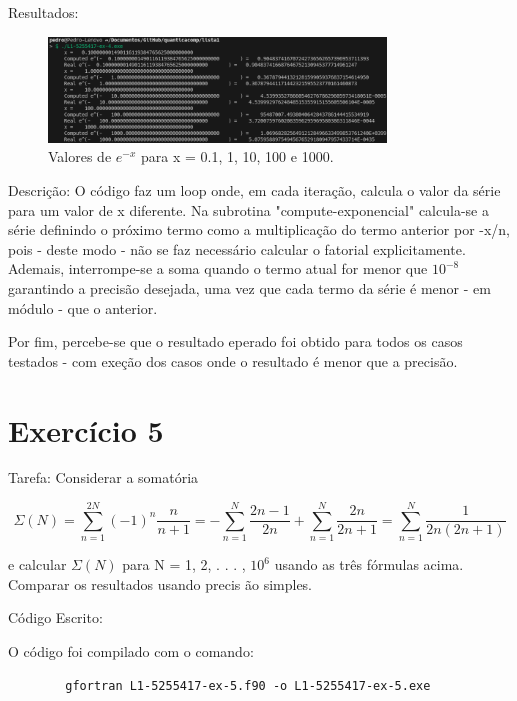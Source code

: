 \documentclass[12pt, a4paper]{article} %
\begin{document}
    Resultados:
    \begin{figure}[H]
        \centering
        \includegraphics[width=0.8\textwidth]{../images/results-ex4.png}
        \caption{Valores de $e^{-x}$ para x = 0.1, 1, 10, 100 e 1000.}
    \end{figure}

    Descri\c{c}\~ao: O c\'odigo faz um loop onde, em cada itera\c{c}\~ao, calcula o valor da s\'erie para um valor de x diferente. Na subrotina "compute-exponencial" calcula-se a s\'erie definindo o pr\'oximo termo como a multiplica\c{c}\~ao do termo anterior por -x/n, pois - deste modo - n\~ao se faz necess\'ario calcular o fatorial explicitamente. Ademais, interrompe-se a soma quando o termo atual for menor que $10^{-8}$ garantindo a precis\~ao desejada, uma vez que cada termo da s\'erie \'e menor - em m\'odulo - que o anterior.

    Por fim, percebe-se que o resultado eperado foi obtido para todos os casos testados - com exe\c{c}\~ao dos casos onde o resultado \'e menor que a precis\~ao.

\section{Exerc\'icio 5}

    Tarefa: Considerar a somat\'oria

    \begin{equation} \Sigma (N) = \sum_{n=1}^{2N} (-1)^n\frac{n}{n+1} = - \sum_{n=1}^N \frac{2n-1}{2n} + \sum_{n=1}^N \frac{2n}{2n+1} = \sum_{n=1}^N \frac{1}{2n(2n+1)} \end{equation}

    e calcular $\Sigma (N)$ para N = 1, 2, . . . , $10^6$ usando as tr\^es f\'ormulas acima. Comparar os resultados usando precis \~ao simples.

    C\'odigo Escrito:
    

    O c\'odigo foi compilado com o comando:
    \begin{verbatim}
        gfortran L1-5255417-ex-5.f90 -o L1-5255417-ex-5.exe
    \end{verbatim}
\end{document}

